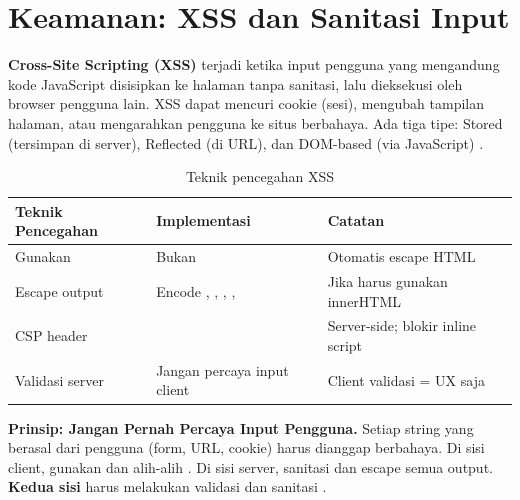 ﻿\section{Keamanan: XSS dan Sanitasi Input}

\textbf{Cross-Site Scripting (XSS)} terjadi ketika input pengguna yang mengandung kode JavaScript disisipkan ke halaman tanpa sanitasi, lalu dieksekusi oleh browser pengguna lain. XSS dapat mencuri cookie (sesi), mengubah tampilan halaman, atau mengarahkan pengguna ke situs berbahaya. Ada tiga tipe: Stored (tersimpan di server), Reflected (di URL), dan DOM-based (via JavaScript) \cite{owaspXss}.

\begin{table}[H]
\centering
\begin{tabular}{|P{3cm}|P{4.5cm}|P{4.5cm}|}
\hline
\textbf{Teknik Pencegahan} & \textbf{Implementasi} & \textbf{Catatan} \\
\hline
Gunakan  & Bukan  & Otomatis escape HTML \\
\hline
Escape output & Encode \code{<}, \code{>}, \code{\&}, ,  & Jika harus gunakan innerHTML \\
\hline
CSP header &  & Server-side; blokir inline script \\
\hline
Validasi server & Jangan percaya input client & Client validasi = UX saja \\
\hline
\end{tabular}
\caption{Teknik pencegahan XSS}
\end{table}

\begin{catatan}
\textbf{Prinsip: Jangan Pernah Percaya Input Pengguna.} Setiap string yang berasal dari pengguna (form, URL, cookie) harus dianggap berbahaya. Di sisi client, gunakan  dan  alih-alih . Di sisi server, sanitasi dan escape semua output. \textbf{Kedua sisi} harus melakukan validasi dan sanitasi \cite{owaspXss}.
\end{catatan}

